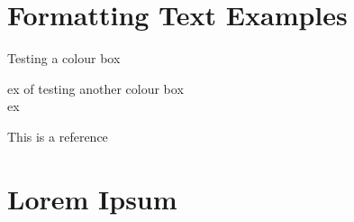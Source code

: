 \section{Formatting Text Examples}
\begin{tcolorbox}[]
Testing a colour box
\end{tcolorbox}

\begin{tcolorbox}[colback=red!5!white, colframe=red!50!black,
	title=Fancy Colour Box]
	\gls{ex} of testing another colour box\\
	\gls{ex}
\end{tcolorbox}

This is a reference \parencites{SpaceSnifferFeatures}

\section{Lorem Ipsum}

\lipsum[1-3]